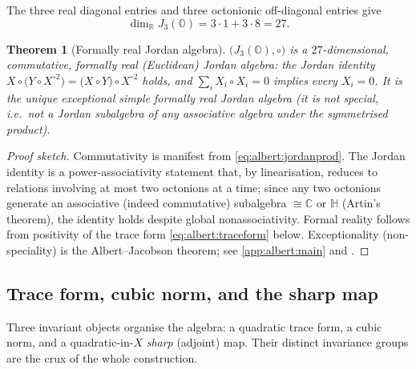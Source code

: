 \documentclass[11pt]{article}
\theoremstyle{plain}
\newtheorem{theorem}{Theorem}[section]
\theoremstyle{definition}
\theoremstyle{remark}
\begin{document}
The three real diagonal entries and three octonionic off-diagonal
entries give
\begin{equation}\label{eq:albert:dim}
  \dim_{\mathbb{R}} J_{3}(\mathbb{O})
  = 3\cdot 1 + 3\cdot 8 = 27 .
\end{equation}

\begin{theorem}[Formally real Jordan algebra]\label{thm:albert:formallyreal}
$\bigl(J_{3}(\mathbb{O}),\circ\bigr)$ is a $27$-dimensional, commutative,
formally real (Euclidean) Jordan algebra: the Jordan identity
$X\circ\bigl(Y\circ X^{\circ 2}\bigr)=\bigl(X\circ Y\bigr)\circ X^{\circ 2}$
holds, and $\sum_{i} X_{i}\circ X_{i}=0$ implies every $X_{i}=0$. It is
the unique exceptional simple formally real Jordan algebra (it is not
special, i.e.\ not a Jordan subalgebra of any associative algebra under
the symmetrised product).
\end{theorem}

\begin{proof}[Proof sketch]
Commutativity is manifest from \eqref{eq:albert:jordanprod}. The Jordan
identity is a power-associativity statement that, by linearisation,
reduces to relations involving at most two octonions at a time; since any
two octonions generate an associative (indeed commutative) subalgebra
$\cong\mathbb{C}$ or $\mathbb{H}$ (Artin's theorem), the identity holds
despite global nonassociativity. Formal reality follows from positivity
of the trace form \eqref{eq:albert:traceform} below. Exceptionality
(non-speciality) is the Albert--Jacobson theorem; see
\autoref{app:albert:main} and \cite{Albert:1934,Jacobson:1968,McCrimmon:2004}.
\end{proof}

\subsection{Trace form, cubic norm, and the sharp map}
\label{sec:albert:invariants}

Three invariant objects organise the algebra: a quadratic trace form, a
cubic norm, and a quadratic-in-$X$ \emph{sharp} (adjoint) map. Their
distinct invariance groups are the crux of the whole construction.
\end{document}
